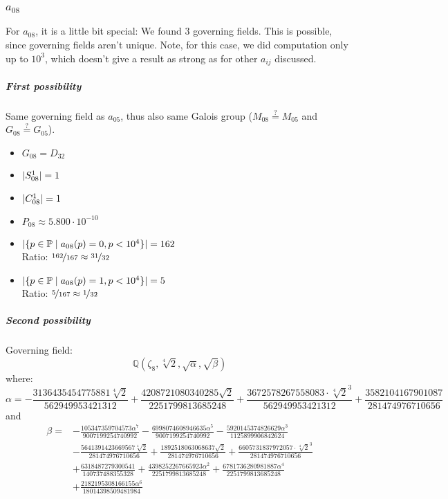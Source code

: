 \subsubsection{$a_{08}$}
For $a_{08}$, it is a little bit special: We found 3 governing fields. This is possible, since governing fields aren't unique. Note, for this case, we did computation only up to $10^3$, which doesn't give a result as strong as for other $a_{ij}$ discussed.
\subparagraph{First possibility}
Same governing field as $a_{05}$, thus also same Galois group ($M_{08} \stackrel{?}{=} M_{05}$ and $G_{08} \stackrel{?}{=} G_{05}$).
\begin{multicols}{2}
	\begin{itemize}
		\item $G_{08} = D_{32}$
		\item $| S_{08}^1 | = 1$
		\item $| C_{08}^1 | = 1$
		\item $P_{08} \approx 5.800 \cdot 10^{-10}$
	\end{itemize}
	\begin{itemize}
		\item $| \{ p \in \mathbb{P} \mid a_{08}(p)=0, p<10^4 \} | = 162$\\
		Ratio: $\nicefrac{ 162 }{ 167 } \approx \nicefrac{ 31 }{ 32 }$
		\item $| \{ p \in \mathbb{P} \mid a_{08}(p)=1, p<10^4 \} | = 5$\\
		Ratio: $\nicefrac{ 5 }{ 167 } \approx \nicefrac{ 1 }{ 32 }$
	\end{itemize}
\end{multicols}
\subparagraph{Second possibility}
Governing field:
$$\mathbb{Q}\left(\zeta_8, \sqrt[4]{2}, \sqrt{\alpha}, \sqrt{\beta}\right)$$
where:
$$\alpha = - \frac{3136435454775881 \sqrt[4]{2}}{562949953421312} + \frac{4208721080340285 \sqrt{2}}{2251799813685248} + \frac{3672578267558083 \cdot \sqrt[4]{2}^3}{562949953421312} + \frac{3582104167901087}{281474976710656}$$
and
\begin{align*}
\beta = 
&- \frac{105347359704573 \alpha^{7}}{9007199254740992} 
- \frac{6998074608946635 \alpha^{5}}{9007199254740992} 
- \frac{5920145374826629 \alpha^{3}}{1125899906842624} 
\\
&- \frac{5641391423669567 \sqrt[4]{2}}{281474976710656} 
+ \frac{1892518063068637 \sqrt{2}}{281474976710656} 
+ \frac{6605731837972057 \cdot \sqrt[4]{2}^3}{281474976710656} 
\\
&+ \frac{6318487279300541}{140737488355328} 
+ \frac{4398252267665923 \alpha^{2}}{2251799813685248} 
+ \frac{6781736280981887 \alpha^{4}}{2251799813685248} 
\\
&+ \frac{2182195308166155 \alpha^{6}}{18014398509481984}
\end{align*}
